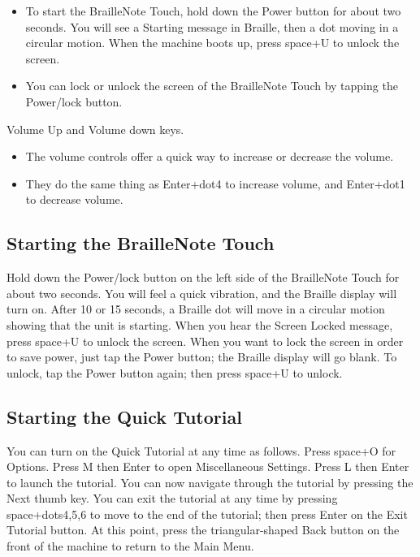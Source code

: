 \documentclass[10pt,letterpaper,twoside]{report}
\begin{document}
{{{\begin{itemize}
\begin{itemize}
		\begin{itemize}
			\item To start the BrailleNote Touch, hold down the Power button for about two seconds. You will see a Starting message in Braille, then a dot moving in a circular motion. 
			When the machine boots up, press space+U to unlock the screen. 
			\item You can lock or unlock the screen of the BrailleNote Touch by tapping the Power/lock button.
		\end{itemize}
		Volume Up and Volume down keys.
		\begin{itemize}
		\item 	The volume controls offer a quick way to increase or decrease the volume. 
		\item 	They do the same thing as Enter+dot4 to increase volume, and Enter+dot1 to decrease volume.
		\end{itemize}
	\end{itemize}
\end{itemize}
\subsection{Starting the BrailleNote Touch}
	Hold down the Power/lock button on the left side of the BrailleNote Touch for about two seconds. 
	You will feel a quick vibration, and the Braille display will turn on. 
	After 10 or 15 seconds, a Braille dot will move in a circular motion showing that the unit is starting. 
	When you hear the Screen Locked message, press space+U to unlock the screen. 
	When you want to lock the screen in order to save power, just tap the Power button; the Braille display will go blank. 
	To unlock, tap the Power button again; then press space+U to unlock.

\subsection{Starting the Quick Tutorial}
You can turn on the Quick Tutorial at any time as follows.
	Press space+O for Options. 
	Press M then Enter to open Miscellaneous Settings. 
	Press L then Enter to launch the tutorial.
		You can now navigate through the tutorial by pressing the Next thumb key. 
		You can exit the tutorial at any time by pressing space+dots4,5,6 to move to the end of the tutorial; then press Enter on the Exit Tutorial button.
	At this point, press the triangular-shaped Back button on the front of the machine to return to the Main Menu.

}}}
\end{document}

